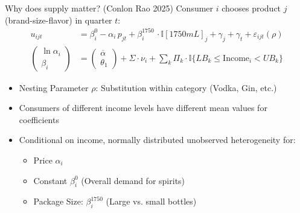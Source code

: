 \documentclass[aspectratio=169,10pt]{beamer}
\begin{document}
\begin{frame}{Why does supply matter? (Conlon Rao 2025)}
Consumer $i$ chooses product $j$ (brand-size-flavor) in quarter $t$:
\begin{align*}
u_{ijt} &= \beta_{i}^0 -  \alpha_i\, p_{jt} + \beta_i^{1750}\, \cdot \mathbb{I}[1750mL]_j + \gamma_j + \gamma_t+ \varepsilon_{ijt}(\rho)\\
\begin{pmatrix}
\ln \alpha_i\\
\beta_i
\end{pmatrix} &=
\begin{pmatrix}
\overline{\alpha}\\
\theta_1
\end{pmatrix} + \Sigma \cdot \nu_i + \sum_{k} \Pi_k \cdot \mathbb{I}\{LB_k \leq \text{Income}_i < UB_k\} 
\end{align*}
\begin{itemize}
\item Nesting Parameter $\rho$: Substitution within category (Vodka, Gin, etc.) %
\item Consumers of different income levels have different mean values for coefficients
\item Conditional on income, normally distributed unobserved heterogeneity for:
\begin{itemize}
\item Price $\alpha_i$
\item Constant $\beta_{i}^0$ (Overall demand for spirits)
\item Package Size: $\beta_{i}^{1750}$ (Large vs. small bottles)
\end{itemize}
\end{itemize}
\end{frame}
\end{document}

